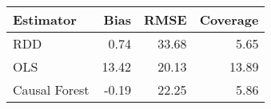 \begin{table}[ht]
\centering
\begin{tabular}{lrrr}
  \hline
Estimator & Bias & RMSE & Coverage \\ 
  \hline
RDD & 0.74 & 33.68 & 5.65 \\ 
  OLS & 13.42 & 20.13 & 13.89 \\ 
  Causal Forest & -0.19 & 22.25 & 5.86 \\ 
   \hline
\end{tabular}
\caption{} 
\end{table}
